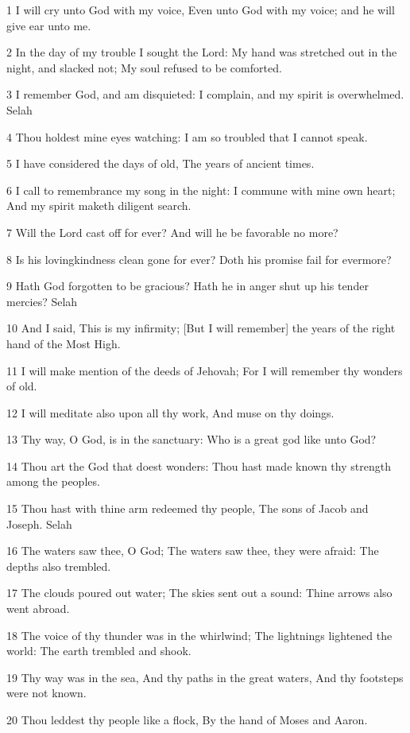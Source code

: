 \par 1 I will cry unto God with my voice, Even unto God with my voice; and he will give ear unto me.
\par 2 In the day of my trouble I sought the Lord: My hand was stretched out in the night, and slacked not; My soul refused to be comforted.
\par 3 I remember God, and am disquieted: I complain, and my spirit is overwhelmed. Selah
\par 4 Thou holdest mine eyes watching: I am so troubled that I cannot speak.
\par 5 I have considered the days of old, The years of ancient times.
\par 6 I call to remembrance my song in the night: I commune with mine own heart; And my spirit maketh diligent search.
\par 7 Will the Lord cast off for ever? And will he be favorable no more?
\par 8 Is his lovingkindness clean gone for ever? Doth his promise fail for evermore?
\par 9 Hath God forgotten to be gracious? Hath he in anger shut up his tender mercies? Selah
\par 10 And I said, This is my infirmity; [But I will remember] the years of the right hand of the Most High.
\par 11 I will make mention of the deeds of Jehovah; For I will remember thy wonders of old.
\par 12 I will meditate also upon all thy work, And muse on thy doings.
\par 13 Thy way, O God, is in the sanctuary: Who is a great god like unto God?
\par 14 Thou art the God that doest wonders: Thou hast made known thy strength among the peoples.
\par 15 Thou hast with thine arm redeemed thy people, The sons of Jacob and Joseph. Selah
\par 16 The waters saw thee, O God; The waters saw thee, they were afraid: The depths also trembled.
\par 17 The clouds poured out water; The skies sent out a sound: Thine arrows also went abroad.
\par 18 The voice of thy thunder was in the whirlwind; The lightnings lightened the world: The earth trembled and shook.
\par 19 Thy way was in the sea, And thy paths in the great waters, And thy footsteps were not known.
\par 20 Thou leddest thy people like a flock, By the hand of Moses and Aaron.

